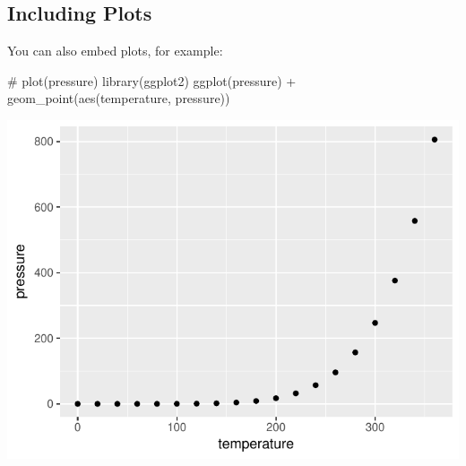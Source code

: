 \documentclass[article]{jss}
\begin{document}
\subsection{Including Plots}\label{including-plots}

You can also embed plots, for example:

\begin{CodeChunk}
\begin{CodeInput}
# plot(pressure)
library(ggplot2)
ggplot(pressure) +
  geom_point(aes(temperature, pressure))
\end{CodeInput}


\begin{center}\includegraphics{Untitled_files/figure-latex/pressure-1} \end{center}

\end{CodeChunk}
\end{document}
